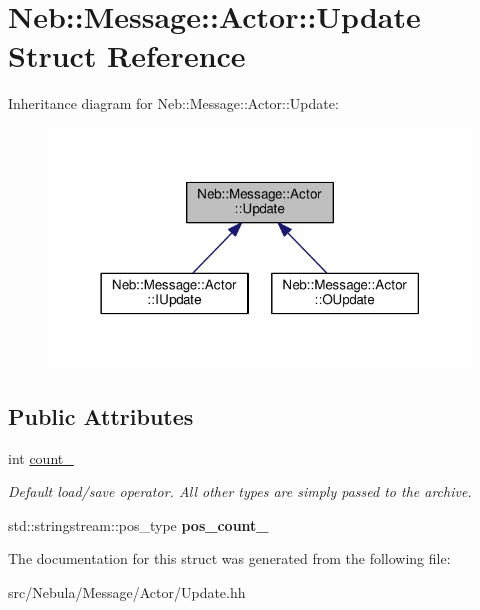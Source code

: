 \hypertarget{structNeb_1_1Message_1_1Actor_1_1Update}{\section{Neb\-:\-:Message\-:\-:Actor\-:\-:Update Struct Reference}
\label{structNeb_1_1Message_1_1Actor_1_1Update}
}


Inheritance diagram for Neb\-:\-:Message\-:\-:Actor\-:\-:Update\-:
\nopagebreak
\begin{figure}[H]
\begin{center}
\leavevmode
\includegraphics[width=318pt]{structNeb_1_1Message_1_1Actor_1_1Update__inherit__graph}
\end{center}
\end{figure}
\subsection*{Public Attributes}
\begin{DoxyCompactItemize}
\item 
\hypertarget{structNeb_1_1Message_1_1Actor_1_1Update_a4e82d6d5a0a84f6593b7322a535fbb6c}{int \hyperlink{structNeb_1_1Message_1_1Actor_1_1Update_a4e82d6d5a0a84f6593b7322a535fbb6c}{count\-\_\-}}\label{structNeb_1_1Message_1_1Actor_1_1Update_a4e82d6d5a0a84f6593b7322a535fbb6c}

\begin{DoxyCompactList}\small\item\em Default load/save operator. All other types are simply passed to the archive. \end{DoxyCompactList}\item 
\hypertarget{structNeb_1_1Message_1_1Actor_1_1Update_afbf7999816776b210f2641cd3a575212}{std\-::stringstream\-::pos\-\_\-type {\bfseries pos\-\_\-count\-\_\-}}\label{structNeb_1_1Message_1_1Actor_1_1Update_afbf7999816776b210f2641cd3a575212}

\end{DoxyCompactItemize}


The documentation for this struct was generated from the following file\-:\begin{DoxyCompactItemize}
\item 
src/\-Nebula/\-Message/\-Actor/Update.\-hh\end{DoxyCompactItemize}

